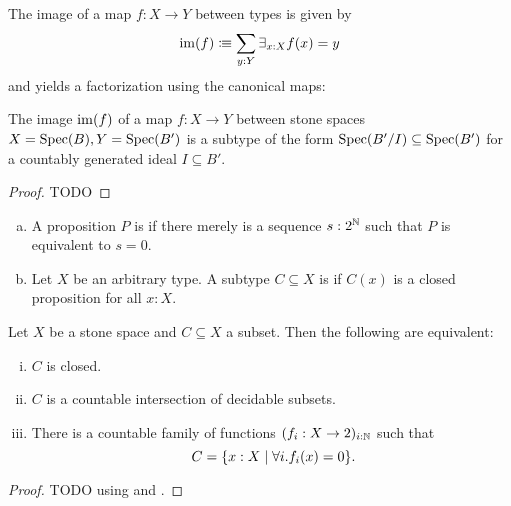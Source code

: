 \begin{definition}
  The image of a map $f:X\to Y$ between types is given by
  \[
  \operatorname{im}(f) \vcentcolon\mspace{-1.2mu}\equiv \sum_{y:Y} \exists_{x:X}f(x)=y
  \]
  and yields a factorization using the canonical maps:
  \begin{center}
  \end{center}
\end{definition}

\begin{proposition}
  \label{stone-image}
  The image $\operatorname{im}(f)$ of a map $f:X\to Y$ between stone spaces $X=\operatorname{Spec}(B),Y=\operatorname{Spec}(B')$ is a subtype of the form $\operatorname{Spec}(B'/I)\subseteq \operatorname{Spec}(B')$ for a countably generated ideal $I\subseteq B'$.  
\end{proposition}

\begin{proof}
  TODO
\end{proof}

\begin{definition}
  \begin{enumerate}[(a)]
  \item A proposition $P$ is  if there merely is a sequence $s:2^{\mathbb{N}}$ such that $P$ is equivalent to $s=0$.
  \item Let $X$ be an arbitrary type.
    A subtype $C\subseteq X$ is  if $C(x)$ is a closed proposition for all $x:X$.
  \end{enumerate}
\end{definition}

\begin{proposition}
  Let $X$ be a stone space and $C\subseteq X$ a subset.
  Then the following are equivalent:
  \begin{enumerate}[(i)]
  \item $C$ is closed.
  \item $C$ is a countable intersection of decidable subsets.
  \item There is a countable family of functions $(f_i:X\to 2)_{i:\mathbb{N}}$ such that
    \[
    C=\{ x:X \mid \forall i. f_i(x)=0 \}
    \rlap{.}
    \]
  \end{enumerate}
\end{proposition}

\begin{proof}
  TODO using  and .
\end{proof}
